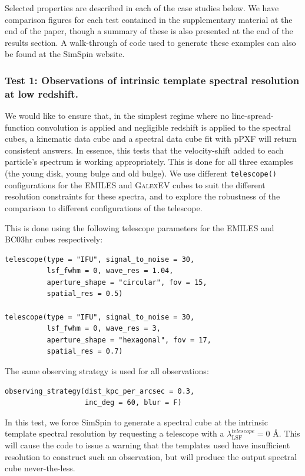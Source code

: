 \documentclass[
  journal=pasa,
  manuscript=research-paper, %
  year=2020,
  volume=37,
]{cup-journal}
\newcommand{\telescope}[1]{\texttt{telescope()}#1}
\begin{document}
Selected properties are described in each of the case studies below. 
We have comparison figures for each test contained in the supplementary material at the end of the paper, though a summary of these is also presented at the end of the results section. 
A walk-through of code used to generate these examples can also be found at the SimSpin website. 

\subsubsection*{Test 1: Observations of intrinsic template spectral resolution at low redshift. \\ }

We would like to ensure that, in the simplest regime where no line-spread-function convolution is applied and negligible redshift is applied to the spectral cubes, a kinematic data cube and a spectral data cube fit with pPXF will return consistent answers. 
In essence, this tests that the velocity-shift added to each particle's spectrum is working appropriately. 
This is done for all three examples (the young disk, young bulge and old bulge). 
We use different \telescope{} configurations for the EMILES and \textsc{GalexEV} cubes to suit the different resolution constraints for these spectra, and to explore the robustness of the comparison to different configurations of the telescope. 

This is done using the following telescope parameters for the EMILES and BC03hr cubes respectively:
\begin{lstlisting}[basicstyle=\fontsize{6}{8}\selectfont\ttfamily]
telescope(type = "IFU", signal_to_noise = 30, 
          lsf_fwhm = 0, wave_res = 1.04,
          aperture_shape = "circular", fov = 15,
          spatial_res = 0.5)

telescope(type = "IFU", signal_to_noise = 30, 
          lsf_fwhm = 0, wave_res = 3, 
          aperture_shape = "hexagonal", fov = 17,
          spatial_res = 0.7)
\end{lstlisting}

\noindent The same observing strategy is used for all observations:
\begin{lstlisting}[basicstyle=\fontsize{6}{8}\selectfont\ttfamily]
observing_strategy(dist_kpc_per_arcsec = 0.3, 
                   inc_deg = 60, blur = F)
\end{lstlisting}

In this test, we force SimSpin to generate a spectral cube at the intrinsic template spectral resolution by requesting a telescope with a $\lambda_{\text{LSF}}^{telescope} = 0$ \AA.
This will cause the code to issue a warning that the templates used have insufficient resolution to construct such an observation, but will produce the output spectral cube never-the-less. 
\end{document}
